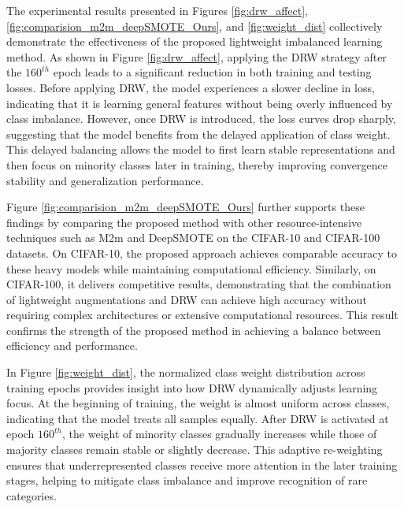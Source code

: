 The experimental results presented in Figures \ref{fig:drw_affect}, \ref{fig:comparision_m2m_deepSMOTE_Ours}, and \ref{fig:weight_dist} collectively demonstrate the effectiveness of the proposed lightweight imbalanced learning method. As shown in Figure \ref{fig:drw_affect}, applying the DRW strategy after the $160^{th}$ epoch leads to a significant reduction in both training and testing losses. Before applying DRW, the model experiences a slower decline in loss, indicating that it is learning general features without being overly influenced by class imbalance. However, once DRW is introduced, the loss curves drop sharply, suggesting that the model benefits from the delayed application of class weight. This delayed balancing allows the model to first learn stable representations and then focus on minority classes later in training, thereby improving convergence stability and generalization performance.

Figure \ref{fig:comparision_m2m_deepSMOTE_Ours} further supports these findings by comparing the proposed method with other resource-intensive techniques such as M2m and DeepSMOTE on the CIFAR-10 and CIFAR-100 datasets. On CIFAR-10, the proposed approach achieves comparable accuracy to these heavy models while maintaining computational efficiency. Similarly, on CIFAR-100, it delivers competitive results, demonstrating that the combination of lightweight augmentations and DRW can achieve high accuracy without requiring complex architectures or extensive computational resources. This result confirms the strength of the proposed method in achieving a balance between efficiency and performance.

In Figure \ref{fig:weight_dist}, the normalized class weight distribution across training epochs provides insight into how DRW dynamically adjusts learning focus. At the beginning of training, the weight is almost uniform across classes, indicating that the model treats all samples equally. After DRW is activated at epoch $160^{th}$, the weight of minority classes gradually increases while those of majority classes remain stable or slightly decrease. This adaptive re-weighting ensures that underrepresented classes receive more attention in the later training stages, helping to mitigate class imbalance and improve recognition of rare categories.